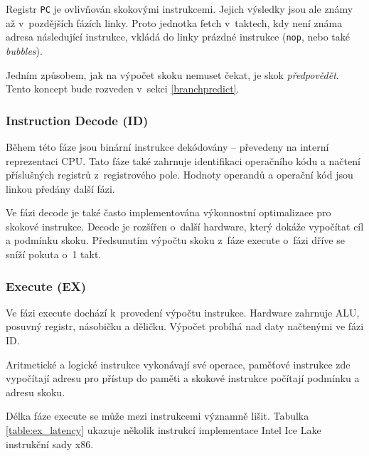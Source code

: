 Registr \texttt{PC} je ovlivňován skokovými instrukcemi.
Jejich výsledky jsou ale známy až v~pozdějších fázích linky.
Proto jednotka fetch v~taktech, kdy není známa adresa následující instrukce, vkládá do linky prázdné instrukce (\texttt{nop}, nebo také \emph{bubbles}).

Jedním způsobem, jak na výpočet skoku nemuset čekat, je skok \emph{předpovědět}.
Tento koncept bude rozveden v~sekci \ref{branchpredict}.

\subsubsection{Instruction Decode (ID)}

Během této fáze jsou binární instrukce dekódovány -- převedeny na interní reprezentaci CPU.
Tato fáze také zahrnuje identifikaci operačního kódu a načtení příslušných registrů z~registrového pole.
Hodnoty operandů a operační kód jsou linkou předány další fázi.

Ve fázi decode je také často implementována výkonnostní optimalizace pro skokové instrukce.
Decode je rozšířen o~další hardware, který dokáže vypočítat cíl a podmínku skoku.
Předsunutím výpočtu skoku z~fáze execute o~fázi dříve se sníží pokuta o~1 takt.

\subsubsection{Execute (EX)}

Ve fázi execute dochází k~provedení výpočtu instrukce.
Hardware zahrnuje ALU, posuvný registr, násobičku a děličku.
Výpočet probíhá nad daty načtenými ve fázi ID.

Aritmetické a logické instrukce vykonávají své operace, paměťové instrukce zde vypočítají adresu pro přístup do paměti a skokové instrukce počítají podmínku a adresu skoku.

Délka fáze execute se může mezi instrukcemi významně lišit.
Tabulka \ref{table:ex_latency} ukazuje několik instrukcí implementace Intel Ice Lake instrukční sady x86.

